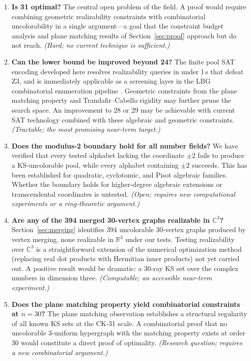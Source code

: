\documentclass[twocolumn,pra,superscriptaddress,nofootinbib]{revtex4-2}
\newcommand{\R}{\mathbb{R}}
\begin{document}
\begin{enumerate}

\item \textbf{Is 31 optimal?} The central open problem of the field. A proof
would require combining geometric realizability constraints with combinatorial
uncolorability in a single argument---a goal that the constraint budget
analysis and plane matching results of Section~\ref{sec:proof} approach but do
not reach. \textit{(Hard; no current technique is sufficient.)}

\item \textbf{Can the lower bound be improved beyond 24?} The finite pool SAT
encoding developed here resolves realizability queries in under 1\,s that defeat
Z3, and is immediately applicable as a screening layer in the LBG combinatorial
enumeration pipeline \cite{LiBrightGanesh2024}. Geometric constraints from the
plane matching property and Trandafir--Cabello rigidity \cite{TrandafirCabello2025}
may further prune the search space. An improvement to 28 or 29 may be achievable
with current SAT technology combined with these algebraic and geometric
constraints. \textit{(Tractable; the most promising near-term target.)}

\item \textbf{Does the modulus-2 boundary hold for all number fields?} We have
verified that every tested alphabet lacking the coordinate $\pm 2$ fails to
produce a KS-uncolorable pool, while every alphabet containing $\pm 2$ succeeds.
This has been established for quadratic, cyclotomic, and Pisot algebraic
families. Whether the boundary holds for higher-degree algebraic extensions or
transcendental coordinates is untested. \textit{(Open; requires new
computational experiments or a ring-theoretic argument.)}

\item \textbf{Are any of the 394 merged 30-vertex graphs realizable in
$\mathbb{C}^3$?} Section~\ref{sec:merging} identifies 394 uncolorable
30-vertex graphs produced by vertex merging, none realizable in $\R^3$ under
our tests. Testing realizability over $\mathbb{C}^3$ is a straightforward
extension of the numerical optimization method (replacing real dot products
with Hermitian inner products) not yet carried out. A positive result would
be dramatic: a 30-ray KS set over the complex numbers in dimension three.
\textit{(Computable; an accessible near-term experiment.)}

\item \textbf{Does the plane matching property yield combinatorial constraints
at $n = 30$?} The plane matching observation establishes a structural
regularity of all known KS sets at the CK-31 scale. A combinatorial proof
that no uncolorable 3-uniform hypergraph with the matching property exists
at order 30 would constitute a direct proof of optimality. \textit{(Research
question; requires a new combinatorial argument.)}


\end{enumerate}
\end{document}
